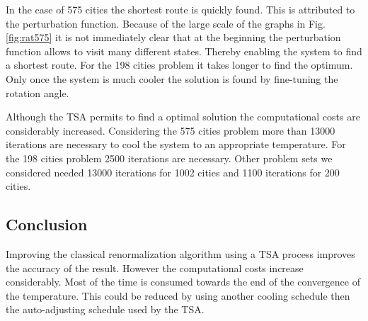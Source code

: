 In the case of 575 cities the shortest route is quickly found. This is
attributed to the perturbation function. Because of the large scale of the
graphs in Fig. \ref{fig:rat575} it is not immediately clear that at the
beginning the perturbation function allows to visit many different states.
Thereby enabling the system to find a shortest route. For the 198 cities
problem it takes longer to find the optimum. Only once the system is much
cooler the solution is found by fine-tuning the rotation angle.

Although the TSA permits to find a optimal solution the computational costs
are considerably increased. Considering the 575 cities problem more than 13000
iterations are necessary to cool the system to an appropriate temperature. For
the 198 cities problem 2500 iterations are necessary. Other problem sets
we considered needed 13000 iterations for 1002 cities and 1100 iterations for
200 cities.

\subsection{Conclusion}
Improving the classical renormalization algorithm using a TSA process improves
the accuracy of the result. However the computational costs increase considerably.
Most of the time is consumed towards the end of the convergence of the
temperature. This could be reduced by using another cooling schedule then the 
auto-adjusting schedule used by the TSA.


